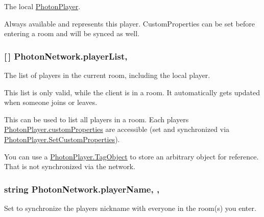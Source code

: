 The local \hyperlink{class_photon_player}{Photon\+Player}. 

Always available and represents this player. Custom\+Properties can be set before entering a room and will be synced as well. 
\subsubsection[{\texorpdfstring{player\+List}{playerList}}]{ \mbox{[}$\,$\mbox{]} Photon\+Network.\+player\+List\hspace{0.3cm}{\ttfamily [static]}, {\ttfamily [get]}}\hypertarget{class_photon_network_a2dc5e6cba79f899d9952f804db35b2f3}{}\label{class_photon_network_a2dc5e6cba79f899d9952f804db35b2f3}


The list of players in the current room, including the local player. 

This list is only valid, while the client is in a room. It automatically gets updated when someone joins or leaves.

This can be used to list all players in a room. Each player\textquotesingle{}s \hyperlink{class_photon_player_ab7e0bc6125b15524e74b5ac9d7c337d7}{Photon\+Player.\+custom\+Properties} are accessible (set and synchronized via \hyperlink{class_photon_player_af8815abb8edaafbe6bddbf328f9612fb}{Photon\+Player.\+Set\+Custom\+Properties}).

You can use a \hyperlink{class_photon_player_aaf54b32878a605d3e4d47f16ad106aa3}{Photon\+Player.\+Tag\+Object} to store an arbitrary object for reference. That is not synchronized via the network. 
\subsubsection[{\texorpdfstring{player\+Name}{playerName}}]{\setlength{\rightskip}{0pt plus 5cm}string Photon\+Network.\+player\+Name\hspace{0.3cm}{\ttfamily [static]}, {\ttfamily [get]}, {\ttfamily [set]}}\hypertarget{class_photon_network_abb168e543c15731ec4de869d3a1ad8f4}{}\label{class_photon_network_abb168e543c15731ec4de869d3a1ad8f4}


Set to synchronize the player\textquotesingle{}s nickname with everyone in the room(s) you enter. 

